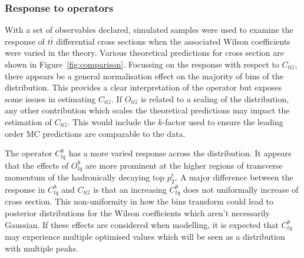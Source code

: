 \documentclass[a4paper,11pt]{article}
\begin{document}
\subsubsection{Response to operators}\label{sec:response}

With a set of observables declared, simulated samples were used to examine the response of $t\bar{t}$ differential cross sections when the associated Wilson coefficients were varied in the theory.
Various theoretical predictions for cross section are shown in Figure~\ref{fig:comparison}.
Focussing on the response with respect to $C_{tG}$, there appears be a general normalisation effect on the majority of bins of the distribution.
This provides a clear interpretation of the operator but exposes some issues in estimating $C_{tG}$.
If $O_{tG}$ is related to a scaling of the distribution, any other contribution which scales the theoretical predictions may impact the estimation of $C_{tG}$.
This would include the $k$-factor used to ensure the leading order MC predictions are comparable to the data.

The operator $C_{tq}^{8}$ has a more varied response across the distribution.
It appears that the effects of $O_{tq}^{8}$ are more prominent at the higher regions of transverse momentum of the hadronically decaying top $p_{T}^{t}$.
A major difference between the response in $C_{tq}^{8}$ and $C_{tG}$ is that an increasing $C_{tq}^{8}$ does not uniformally increase of cross section.
This non-uniformity in how the bins transform could lead to posterior distributions for the Wilson coefficients which aren't necessarily Gaussian.
If these effects are considered when modelling, it is expected that $C_{tq}^{8}$ may experience multiple optimised values which will be seen as a distribution with multiple peaks.
\end{document}
